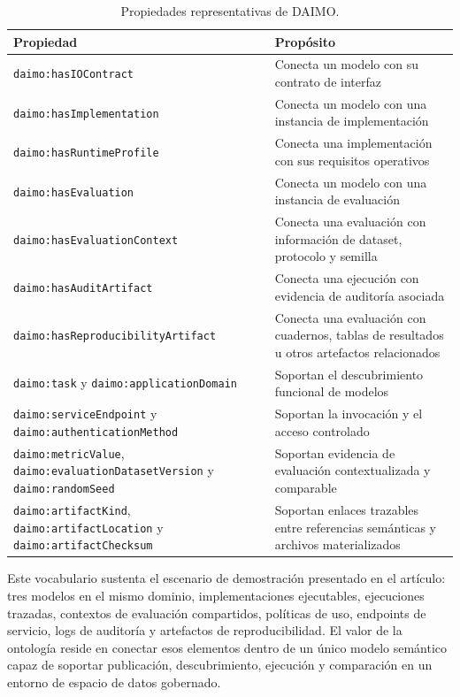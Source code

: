 \documentclass[11pt,a4paper]{article}
\newcommand{\code}[1]{\texttt{#1}}
\begin{document}
\begin{table}[t]
\caption{Propiedades representativas de DAIMO.}
\label{tab:props}
\centering
\small
\begin{tabularx}{\textwidth}{@{}L{5cm}X@{}}
\toprule
\textbf{Propiedad} & \textbf{Propósito} \\
\midrule
\code{daimo:hasIOContract} & Conecta un modelo con su contrato de interfaz \\[0.3em]
\code{daimo:hasImplementation} & Conecta un modelo con una instancia de implementación \\[0.3em]
\code{daimo:hasRuntimeProfile} & Conecta una implementación con sus requisitos operativos \\[0.3em]
\code{daimo:hasEvaluation} & Conecta un modelo con una instancia de evaluación \\[0.3em]
\code{daimo:hasEvaluationContext} & Conecta una evaluación con información de dataset, protocolo y semilla \\[0.3em]
\code{daimo:hasAuditArtifact} & Conecta una ejecución con evidencia de auditoría asociada \\[0.3em]
\code{daimo:hasReproducibilityArtifact} & Conecta una evaluación con cuadernos, tablas de resultados u otros artefactos relacionados \\[0.3em]
\code{daimo:task} y \code{daimo:applicationDomain} & Soportan el descubrimiento funcional de modelos \\[0.3em]
\code{daimo:serviceEndpoint} y \code{daimo:authenticationMethod} & Soportan la invocación y el acceso controlado \\[0.3em]
\code{daimo:metricValue}, \code{daimo:evaluationDatasetVersion} y \code{daimo:randomSeed} & Soportan evidencia de evaluación contextualizada y comparable \\[0.3em]
\code{daimo:artifactKind}, \code{daimo:artifactLocation} y \code{daimo:artifactChecksum} & Soportan enlaces trazables entre referencias semánticas y archivos materializados \\
\bottomrule
\end{tabularx}
\end{table}

Este vocabulario sustenta el escenario de demostración presentado en el artículo: tres modelos en el mismo dominio, implementaciones ejecutables, ejecuciones trazadas, contextos de evaluación compartidos, políticas de uso, endpoints de servicio, logs de auditoría y artefactos de reproducibilidad. El valor de la ontología reside en conectar esos elementos dentro de un único modelo semántico capaz de soportar publicación, descubrimiento, ejecución y comparación en un entorno de espacio de datos gobernado.
\end{document}
